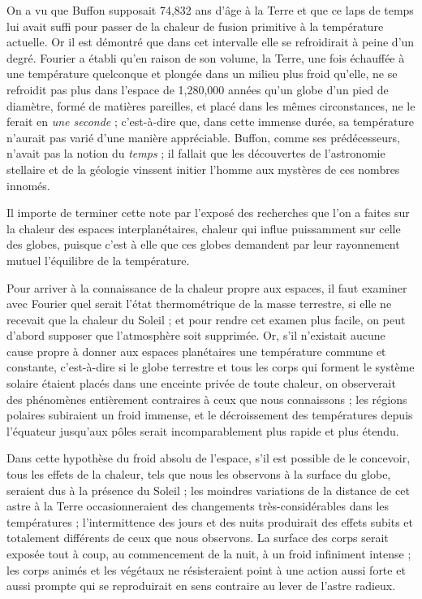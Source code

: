 \documentclass[a4paper, 11pt, oneside, landscape]{article}
\begin{document}
On a vu que Buffon supposait 74,832 ans d'âge à la Terre et que ce laps de temps lui avait suffi pour passer de la chaleur de fusion primitive à la température actuelle. Or il est démontré que dans cet intervalle elle se refroidirait à peine d'un degré. Fourier a établi qu'en raison de son volume, la Terre, une fois échauffée à une température quelconque et plongée dans un milieu plus froid qu'elle, ne se refroidit pas plus dans l'espace de 1,280,000 années qu'un globe d'un pied de diamètre, formé de matières pareilles, et placé dans les mêmes circonstances, ne le ferait en \emph{une seconde} ; c'est-à-dire que, dans cette immense durée, sa température n'aurait pas varié d'une manière appréciable. Buffon, comme ses prédécesseurs, n'avait pas la notion du \emph{temps} ; il fallait que les découvertes de l'astronomie stellaire et de la géologie vinssent initier l'homme aux mystères de ces nombres innomés.

Il importe de terminer cette note par l'exposé des recherches que l'on a faites sur la chaleur des espaces interplanétaires, chaleur qui influe puissamment sur celle des globes, puisque c'est à elle que ces globes demandent par leur rayonnement mutuel l'équilibre de la température.

Pour arriver à la connaissance de la chaleur propre aux espaces, il faut examiner avec Fourier quel serait l'état thermométrique de la masse terrestre, si elle ne recevait que la chaleur du Soleil ; et pour rendre cet examen plus facile, on peut d'abord supposer que l'atmosphère soit supprimée. Or, s'il n'existait aucune cause propre à donner aux espaces planétaires une température commune et constante, c'est-à-dire si le globe terrestre et tous les corps qui forment le système solaire étaient placés dans une enceinte privée de toute chaleur, on observerait des phénomènes entièrement contraires à ceux que nous connaissons ; les régions polaires subiraient un froid immense, et le décroissement des températures depuis l'équateur jusqu'aux pôles serait incomparablement plus rapide et plus étendu.

Dans cette hypothèse du froid absolu de l'espace, s'il est possible de le concevoir, tous les effets de la chaleur, tels que nous les observons à la surface du globe, seraient dus à la présence du Soleil ; les moindres variations de la distance de cet astre à la Terre occasionneraient des changements très-considérables dans les températures ; l'intermittence des jours et des nuits produirait des effets subits et totalement différents de ceux que nous observons. La surface des corps serait exposée tout à coup, au commencement de la nuit, à un froid infiniment intense ; les corps animés et les végétaux ne résisteraient point à une action aussi forte et aussi prompte qui se reproduirait en sens contraire au lever de l'astre radieux.
\end{document}
